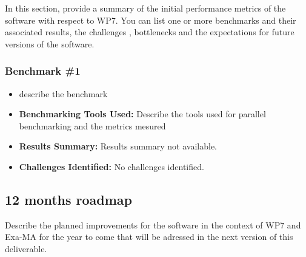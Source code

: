 In this section, provide a summary of the initial performance metrics of the software with respect to WP7.
You can list one or more benchmarks and their associated results, the challenges , bottlenecks and the expectations for future versions of the software.



\subsubsection{Benchmark \#1}
\begin{itemize}
    \item describe the benchmark
    \item \textbf{Benchmarking Tools Used:} Describe the tools used for parallel benchmarking and the metrics mesured
    \item \textbf{Results Summary:} Results summary not available.
    \item \textbf{Challenges Identified:} No challenges identified.
\end{itemize}

\subsection{12 months roadmap}
\label{sec:WP7:FreeFem++:roadmap}

Describe the planned improvements  for the software in the context of WP7 and Exa-MA for the year to come that will be adressed in the next version of this deliverable.